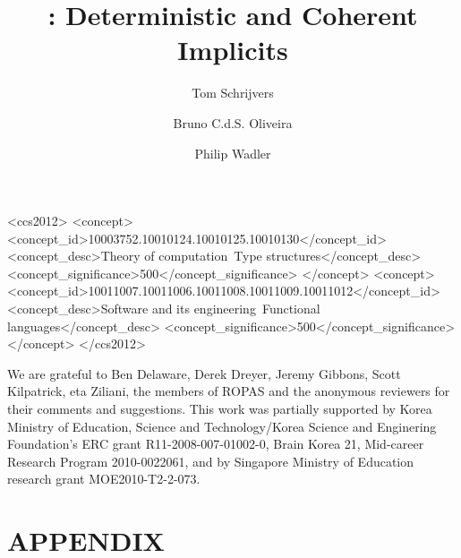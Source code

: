 \documentclass[acmlarge, authorname]{acmart}
\begin{document}
\title{\name: Deterministic and Coherent Implicits}
\author{Tom Schrijvers}
\author{Bruno C.d.S. Oliveira}
\author{Philip Wadler}


\begin{abstract}

\end{abstract}
\begin{CCSXML}
<ccs2012>
<concept>
<concept_id>10003752.10010124.10010125.10010130</concept_id>
<concept_desc>Theory of computation~Type structures</concept_desc>
<concept_significance>500</concept_significance>
</concept>
<concept>
<concept_id>10011007.10011006.10011008.10011009.10011012</concept_id>
<concept_desc>Software and its engineering~Functional languages</concept_desc>
<concept_significance>500</concept_significance>
</concept>
</ccs2012>
\end{CCSXML}


\maketitle













%






\begin{acks}
We are grateful to Ben Delaware, Derek Dreyer, Jeremy Gibbons, Scott
Kilpatrick, eta Ziliani, the members of ROPAS and the
anonymous reviewers for their comments and suggestions.  This work was
partially supported by Korea Ministry of Education, Science and
Technology/Korea Science and Enginering Foundation's ERC grant
R11-2008-007-01002-0, Brain Korea 21, Mid-career Research Program 2010-0022061, and
by Singapore Ministry of Education research grant MOE2010-T2-2-073.
\end{acks}

\newpage


\newpage
\appendix
\section*{APPENDIX}
\setcounter{section}{1}





\end{document}
